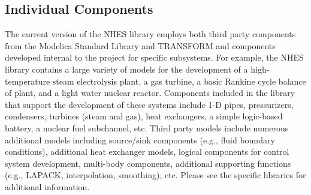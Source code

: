 \subsection{Individual Components}
The current version of the NHES library employs both third party components from the Modelica Standard Library \cite{ModelicaAssociation} and TRANSFORM \cite{TRANSFORM} and components developed internal to the project for specific subsystems. For example, the NHES library contains a large variety of models for the development of a high-temperature steam electrolysis plant, a gas turbine, a basic Rankine cycle balance of plant, and a light water nuclear reactor. Components included in the library that support the development of these systems include 1-D pipes, pressurizers, condensers, turbines (steam and gas), heat exchangers, a simple logic-based battery, a nuclear fuel subchannel, etc. Third party models include numerous additional models including source/sink components (e.g., fluid boundary conditions), additional heat exchanger models, logical components for control system development, multi-body components, additional supporting functions (e.g., LAPACK, interpolation, smoothing), etc. Please see the specific libraries for additional information. 



